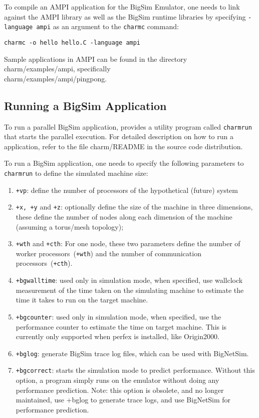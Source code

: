 To compile an AMPI application for the BigSim Emulator, one needs to link
against the AMPI library as well as the BigSim \charmpp{} runtime libraries by
specifying \texttt{-language ampi} as an argument to the {\tt charmc} command:
\begin{verbatim}
charmc -o hello hello.C -language ampi
\end{verbatim}

Sample applications in AMPI can be found in the directory charm/examples/ampi,
specifically \\
charm/examples/ampi/pingpong.

\subsection{Running a BigSim Application}

To run a parallel BigSim application, \charmpp{} provides a utility program
called {\tt charmrun} that starts the parallel execution.  For detailed
description on how to run a \charmpp{} application, refer to the file
charm/README in the source code distribution.

To run a BigSim application, one needs to specify the following parameters to
{\tt charmrun} to define the simulated machine size:

\begin{enumerate}

\item {\tt +vp}: define the number of processors of the hypothetical (future)
system
\item {\tt +x, +y} and {\tt +z}:  optionally define the size of the machine in
three dimensions, these define the number of nodes along each dimension of the
machine (assuming a torus/mesh topology);
\item {\tt +wth} and {\tt +cth}:  For one node, these two parameters define the
number of worker processors~({\tt +wth}) and the number of communication
processors~({\tt +cth}).
\item {\tt +bgwalltime}: used only in simulation mode, when specified, use
wallclock measurement of the time taken on the simulating machine to estimate
the time it takes to run on the target machine.
\item {\tt +bgcounter}:  used only in simulation mode, when specified, use the
performance counter to estimate the time on target machine. This is currently
only supported when perfex is installed, like Origin2000.
\item {\tt +bglog}: generate BigSim trace log files, which can be used with BigNetSim. 
\item {\tt +bgcorrect}: starts the simulation mode to predict performance.
Without this option, a program simply runs on the emulator without doing any
performance prediction.  Note: this option is obsolete, and no longer
maintained, use +bglog to generate trace logs, and use BigNetSim for
performance prediction.  \end{enumerate}

